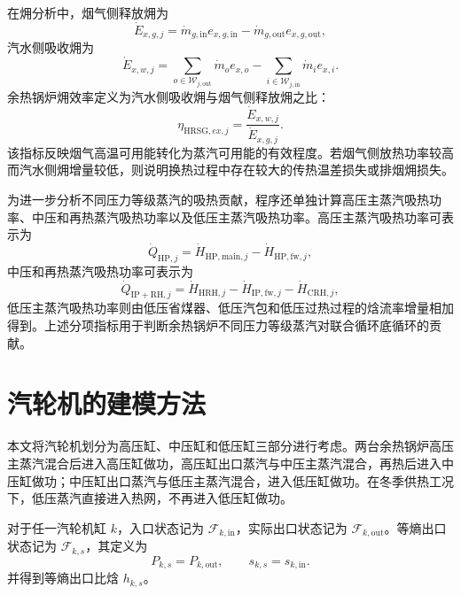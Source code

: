 在㶲分析中，烟气侧释放㶲为
\begin{equation}\label{eq:hrsg-gas-exergy}
\dot{E}_{x,g,j}
=
\dot{m}_{g,\mathrm{in}}e_{x,g,\mathrm{in}}
-
\dot{m}_{g,\mathrm{out}}e_{x,g,\mathrm{out}},
\end{equation}
汽水侧吸收㶲为
\begin{equation}\label{eq:hrsg-water-exergy}
\dot{E}_{x,w,j}
=
\sum_{o\in\mathcal{W}_{j,\mathrm{out}}}\dot{m}_o e_{x,o}
-
\sum_{i\in\mathcal{W}_{j,\mathrm{in}}}\dot{m}_i e_{x,i}.
\end{equation}
余热锅炉㶲效率定义为汽水侧吸收㶲与烟气侧释放㶲之比：
\begin{equation}\label{eq:hrsg-exergy-eff}
\eta_{\mathrm{HRSG},ex,j}
=
\frac{\dot{E}_{x,w,j}}{\dot{E}_{x,g,j}}.
\end{equation}
该指标反映烟气高温可用能转化为蒸汽可用能的有效程度。若烟气侧放热功率较高而汽水侧㶲增量较低，则说明换热过程中存在较大的传热温差损失或排烟㶲损失。

为进一步分析不同压力等级蒸汽的吸热贡献，程序还单独计算高压主蒸汽吸热功率、中压和再热蒸汽吸热功率以及低压主蒸汽吸热功率。高压主蒸汽吸热功率可表示为
\begin{equation}\label{eq:hrsg-hp-heat}
\dot{Q}_{\mathrm{HP},j}
=
\dot{H}_{\mathrm{HP,main},j}
-
\dot{H}_{\mathrm{HP,fw},j},
\end{equation}
中压和再热蒸汽吸热功率可表示为
\begin{equation}\label{eq:hrsg-ip-rh-heat}
\dot{Q}_{\mathrm{IP+RH},j}
=
\dot{H}_{\mathrm{HRH},j}
-
\dot{H}_{\mathrm{IP,fw},j}
-
\dot{H}_{\mathrm{CRH},j},
\end{equation}
低压主蒸汽吸热功率则由低压省煤器、低压汽包和低压过热过程的焓流率增量相加得到。上述分项指标用于判断余热锅炉不同压力等级蒸汽对联合循环底循环的贡献。

\section{汽轮机的建模方法}

本文将汽轮机划分为高压缸、中压缸和低压缸三部分进行考虑。两台余热锅炉高压主蒸汽混合后进入高压缸做功，高压缸出口蒸汽与中压主蒸汽混合，再热后进入中压缸做功；中压缸出口蒸汽与低压主蒸汽混合，进入低压缸做功。在冬季供热工况下，低压蒸汽直接进入热网，不再进入低压缸做功。

对于任一汽轮机缸 $k$，入口状态记为 $\mathcal{F}_{k,\mathrm{in}}$，实际出口状态记为 $\mathcal{F}_{k,\mathrm{out}}$。等熵出口状态记为 $\mathcal{F}_{k,s}$，其定义为
\begin{equation}\label{eq:st-isentropic-state}
P_{k,s}=P_{k,\mathrm{out}},
\qquad
s_{k,s}=s_{k,\mathrm{in}}.
\end{equation}
并得到等熵出口比焓 $h_{k,s}$。

